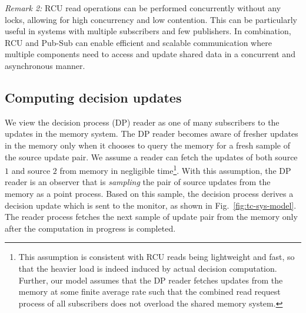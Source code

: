 \documentclass[conference, 10pt]{IEEEtran}
\begin{document}
\textit{Remark 2: } RCU read operations can be performed concurrently without any locks, allowing for high concurrency and low contention. This can be particularly useful in systems with multiple subscribers and few publishers. In combination, RCU and Pub-Sub can enable efficient and scalable communication 
where multiple components need to access and update shared data in a concurrent and asynchronous manner.  


\subsection{Computing decision updates}\label{DPoverview}
% 
We view the decision process (DP) reader as one of many subscribers to the updates in the memory system. 
The DP reader becomes aware of fresher updates in the memory only when it chooses to query the memory for a fresh sample of the source update pair. 
We assume a reader can fetch the updates of both source $1$ and source $2$ from memory in negligible time\footnote{This assumption is consistent with RCU reads being lightweight and fast, so that the heavier load is indeed induced by actual decision computation. Further, our model assumes that the DP reader 
fetches
updates from the memory 
at some finite average rate such that the combined read request process of all subscribers does not overload the shared memory system.}. 
With this assumption, the DP reader  is an observer that is {\em sampling} the pair of source updates from the memory as a point process. 
Based on this sample, the decision process derives a decision update  which is sent to the monitor, as shown  in Fig.~\ref{fig:tc-sys-model}. The reader process fetches the next sample of update pair from the memory only after the computation in progress is completed. 
\end{document}

